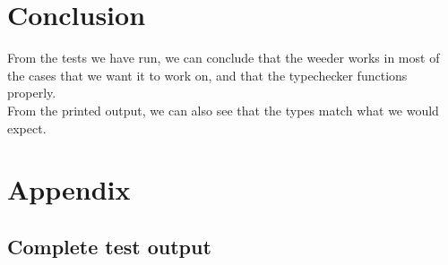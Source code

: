 \documentclass[a4paper,10pt,titlepage]{report}
\begin{document}
\section{Conclusion}
From the tests we have run, we can conclude that the weeder works in most of the cases that we want it to work on, and that the typechecker functions properly.\\
From the printed output, we can also see that the types match what we would expect.

\newpage

\section{Appendix}
\subsection{Complete test output}
\end{document}
